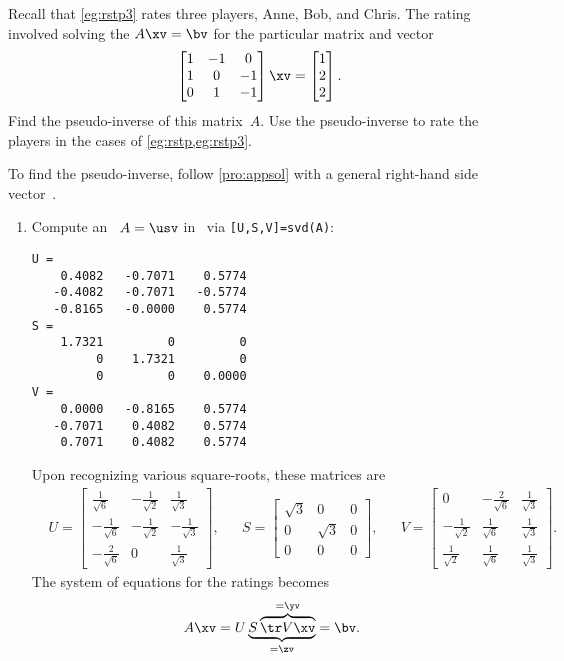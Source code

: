 \begin{example}  
Recall that \cref{eg:rstp3} rates three  players, Anne, Bob, and Chris.  
The rating involved solving the  \(A\xv=\bv\) for the particular matrix and vector
\begin{equation*}
\begin{bmatrix} 1&-1&0\\1&0&-1\\0&1&-1 \end{bmatrix}\xv
=\begin{bmatrix} 1\\2\\2 \end{bmatrix}.
\end{equation*}
Find the pseudo-inverse of this matrix~\(A\).
Use the pseudo-inverse to rate the players in the cases of \cref{eg:rstp,eg:rstp3}.
\begin{solution} 
To find the pseudo-inverse, follow \cref{pro:appsol} with a general right-hand side vector~\bv.
\begin{enumerate}
\item Compute an \svd\ \(A=\usv\) in \script\ via \verb|[U,S,V]=svd(A)|:
\begin{verbatim}
U =
    0.4082   -0.7071    0.5774
   -0.4082   -0.7071   -0.5774
   -0.8165   -0.0000    0.5774
S =
    1.7321         0         0
         0    1.7321         0
         0         0    0.0000
V =
    0.0000   -0.8165    0.5774
   -0.7071    0.4082    0.5774
    0.7071    0.4082    0.5774
\end{verbatim}
Upon recognizing various square-roots, these matrices are
\begin{align*}&
U=\begin{bmatrix} \frac1{\sqrt6}&-\frac1{\sqrt2}&\frac1{\sqrt3}
\\-\frac1{\sqrt6}&-\frac1{\sqrt2}&-\frac1{\sqrt3}
\\-\frac2{\sqrt6}&0&\frac1{\sqrt3} \end{bmatrix},
&&
S=\begin{bmatrix} \sqrt3&0&0
\\0&\sqrt3&0
\\0&0&0 \end{bmatrix},
&&
V=\begin{bmatrix} 0&-\frac2{\sqrt6}&\frac1{\sqrt3}
\\-\frac1{\sqrt2}&\frac1{\sqrt6}&\frac1{\sqrt3}
\\\frac1{\sqrt2}&\frac1{\sqrt6}&\frac1{\sqrt3} \end{bmatrix}.
\end{align*}
The system of equations for the ratings becomes
\begin{equation*}
A\xv=
U\underbrace{S\overbrace{\tr V\xv}^{=\yv}}_{=\zv}
=\bv.
\end{equation*}


\end{enumerate}
\end{solution}
\end{example}
